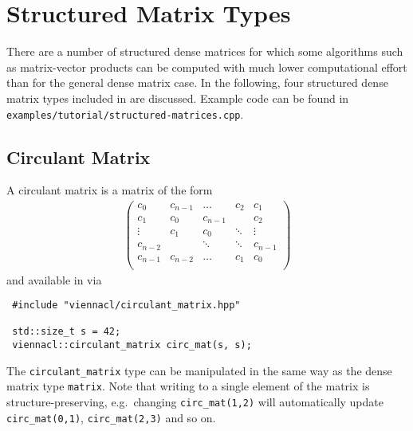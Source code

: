 \chapter{Structured Matrix Types}


There are a number of structured dense matrices for which some algorithms such as matrix-vector products can be computed with much lower computational effort
than for the general dense matrix case. In the following, four structured dense matrix types included in {\ViennaCL} are discussed. 
Example code can be found in \lstinline|examples/tutorial/structured-matrices.cpp|.

\section{Circulant Matrix}
A circulant matrix is a matrix of the form
\begin{align*}
 \left( \begin{array}{ccccc}
         c_0 & c_{n-1} & \ldots & c_2 & c_1 \\
         c_1 & c_0 & c_{n-1} & & c_2 \\
         \vdots & c_1 & c_0 & \ddots & \vdots \\
         c_{n-2} & & \ddots & \ddots & c_{n-1} \\
         c_{n-1} & c_{n-2} & \hdots & c_1 & c_0 \\
        \end{array} \right)
\end{align*}
and available in {\ViennaCL} via
\begin{lstlisting}
 #include "viennacl/circulant_matrix.hpp"

 std::size_t s = 42;
 viennacl::circulant_matrix circ_mat(s, s);
\end{lstlisting}
The \lstinline|circulant_matrix| type can be manipulated in the same way as the dense matrix type \lstinline|matrix|. Note that writing to a single element of
the matrix is structure-preserving, e.g.~changing \lstinline|circ_mat(1,2)| will automatically update \lstinline|circ_mat(0,1)|, \lstinline|circ_mat(2,3)| and
so on.


